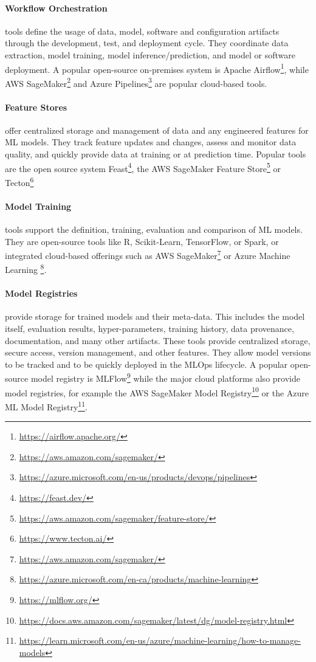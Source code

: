 \paragraph*{Workflow Orchestration} tools define the usage of data, model, software and configuration artifacts through the development, test, and deployment cycle. They coordinate data extraction, model training, model inference/prediction, and model or software deployment. A popular open-source on-premises system is Apache Airflow\footnote{\url{https://airflow.apache.org/}}, while AWS SageMaker\footnote{\url{https://aws.amazon.com/sagemaker/}} and Azure Pipelines\footnote{\url{https://azure.microsoft.com/en-us/products/devops/pipelines}} are popular cloud-based tools. 

\paragraph*{Feature Stores} offer centralized storage and management of data and any engineered features for ML models. They track feature updates and changes, assess and monitor data quality, and quickly provide data at training or at prediction time. Popular tools are the open source system Feast\footnote{\url{https://feast.dev/}}, the AWS SageMaker Feature Store\footnote{\url{https://aws.amazon.com/sagemaker/feature-store/}} or Tecton\footnote{\url{https://www.tecton.ai/}}

\paragraph*{Model Training} tools support the definition, training, evaluation and comparison of ML models. They are open-source tools like R, Scikit-Learn, TensorFlow, or Spark, or integrated cloud-based offerings such as AWS SageMaker\footnote{\url{https://aws.amazon.com/sagemaker/}} or Azure Machine Learning \footnote{\url{https://azure.microsoft.com/en-ca/products/machine-learning}}. 

\paragraph*{Model Registries} provide storage for trained models and their meta-data. This includes the model itself, evaluation results, hyper-parameters, training history, data provenance, documentation, and many other artifacts. These tools provide centralized storage, secure access, version management, and other features. They allow model versions to be tracked and to be quickly deployed in the MLOps lifecycle. A popular open-source model registry is MLFlow\footnote{\url{https://mlflow.org/}} while the major cloud platforms also provide model registries, for example the AWS SageMaker Model Registry\footnote{\url{https://docs.aws.amazon.com/sagemaker/latest/dg/model-registry.html}} or the Azure ML Model Registry\footnote{\url{https://learn.microsoft.com/en-us/azure/machine-learning/how-to-manage-models}}.

